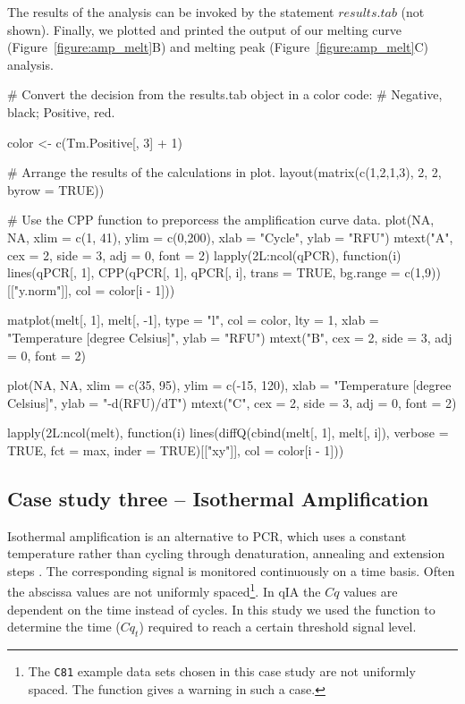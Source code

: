 The results of the analysis can be invoked by the statement $results.tab$ (not 
shown). Finally, we plotted and printed the output of our melting curve 
(Figure~\ref{figure:amp_melt}B) and melting peak 
(Figure~\ref{figure:amp_melt}C) 
analysis.

\begin{example}
# Convert the decision from the results.tab object in a color code:
# Negative, black; Positive, red.

color <- c(Tm.Positive[, 3] + 1)

# Arrange the results of the calculations in plot.
layout(matrix(c(1,2,1,3), 2, 2, byrow = TRUE))

# Use the CPP function to preporcess the amplification curve data.
plot(NA, NA, xlim = c(1, 41), ylim = c(0,200), xlab = "Cycle", ylab = "RFU")
mtext("A", cex = 2, side = 3, adj = 0, font = 2)
lapply(2L:ncol(qPCR), function(i) 
  lines(qPCR[, 1], 
        CPP(qPCR[, 1], qPCR[, i], trans = TRUE, 
            bg.range = c(1,9))[["y.norm"]],
        col = color[i - 1]))

matplot(melt[, 1], melt[, -1], type = "l", col = color, 
        lty = 1, xlab = "Temperature [degree Celsius]", ylab = "RFU")
mtext("B", cex = 2, side = 3, adj = 0, font = 2)

plot(NA, NA, xlim = c(35, 95), ylim = c(-15, 120), xlab = "Temperature [degree 
Celsius]", 
     ylab = "-d(RFU)/dT")
mtext("C", cex = 2, side = 3, adj = 0, font = 2)

lapply(2L:ncol(melt), function(i)
  lines(diffQ(cbind(melt[, 1], melt[, i]), verbose = TRUE, 
              fct = max, inder = TRUE)[["xy"]], col = color[i - 1]))
\end{example}

\subsection{Case study three -- Isothermal Amplification}
Isothermal amplification is an alternative to PCR, which uses a constant 
temperature rather than cycling through denaturation, annealing and extension 
steps \citep{rodiger_nucleic_2014}. The corresponding signal is monitored 
continuously on a time basis. Often the abscissa values are not uniformly 
spaced\footnote{The \texttt{C81} example data sets chosen in this case study 
are 
not uniformly spaced. The  function gives a warning in such a case.}. 
In qIA the $Cq$ values are dependent on the time instead of cycles. In this 
study we used the  function to determine the time ($Cq_{t}$) 
required to reach a certain threshold signal level.


